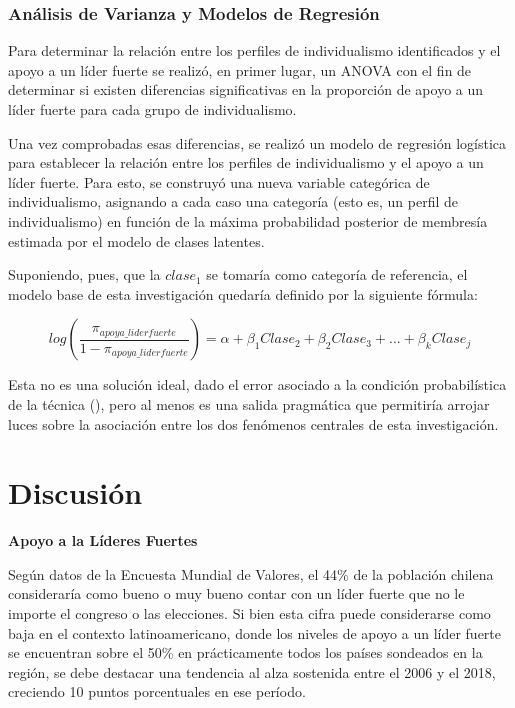 \documentclass[
  letterpaper,
  DIV=11,
  numbers=noendperiod]{scrartcl}
\begin{document}
\subsubsection*{Análisis de Varianza y Modelos de
Regresión}\label{anuxe1lisis-de-varianza-y-modelos-de-regresiuxf3n}

Para determinar la relación entre los perfiles de individualismo
identificados y el apoyo a un líder fuerte se realizó, en primer lugar,
un ANOVA con el fin de determinar si existen diferencias significativas
en la proporción de apoyo a un líder fuerte para cada grupo de
individualismo.

Una vez comprobadas esas diferencias, se realizó un modelo de regresión
logística para establecer la relación entre los perfiles de
individualismo y el apoyo a un líder fuerte. Para esto, se construyó una
nueva variable categórica de individualismo, asignando a cada caso una
categoría (esto es, un perfil de individualismo) en función de la máxima
probabilidad posterior de membresía estimada por el modelo de clases
latentes.

Suponiendo, pues, que la \(clase_1\) se tomaría como categoría de
referencia, el modelo base de esta investigación quedaría definido por
la siguiente fórmula:

\[log(\frac{\pi_{apoya\_liderfuerte}}
{1-\pi_{apoya\_liderfuerte}}) = \alpha + \beta_1Clase_2 + \beta_2Clase_3 + ... + \beta_kClase_j \]

Esta no es una solución ideal, dado el error asociado a la condición
probabilística de la técnica (), pero al menos es una salida pragmática que permitiría arrojar
luces sobre la asociación entre los dos fenómenos centrales de esta
investigación.

\section*{Discusión}\label{discusiuxf3n}

\textbf{Apoyo a la Líderes Fuertes}

Según datos de la Encuesta Mundial de Valores, el 44\% de la población
chilena consideraría como bueno o muy bueno contar con un líder fuerte
que no le importe el congreso o las elecciones. Si bien esta cifra puede
considerarse como baja en el contexto latinoamericano, donde los niveles
de apoyo a un líder fuerte se encuentran sobre el 50\% en prácticamente
todos los países sondeados en la región, se debe destacar una tendencia
al alza sostenida entre el 2006 y el 2018, creciendo 10 puntos
porcentuales en ese período.
\end{document}
